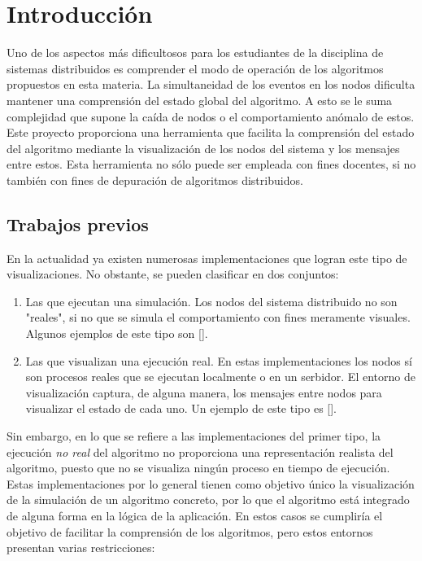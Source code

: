 \chapter{Introducción}
\label{ch:intro}

Uno de los aspectos más dificultosos para los estudiantes de la disciplina de sistemas distribuidos es comprender el modo de operación de los algoritmos propuestos en esta materia. La simultaneidad de los eventos en los nodos dificulta mantener una comprensión del estado global del algoritmo. A esto se le suma complejidad que supone la caída de nodos o el comportamiento anómalo de estos. Este proyecto proporciona una herramienta que facilita la comprensión del estado del algoritmo mediante la visualización de los nodos del sistema y los mensajes entre estos. Esta herramienta no sólo puede ser empleada con fines docentes, si no también con fines de depuración de algoritmos distribuidos.

\section{Trabajos previos}

En la actualidad ya existen numerosas implementaciones que logran este tipo de visualizaciones. No obstante, se pueden clasificar en dos conjuntos:

\begin{enumerate}
\item Las que ejecutan una simulación. Los nodos del sistema distribuido no son "reales", si no que se simula el comportamiento con fines meramente visuales. Algunos ejemplos de este tipo son [].
\item Las que visualizan una ejecución real. En estas implementaciones los nodos sí son procesos reales que se ejecutan localmente o en un serbidor. El entorno de visualización captura, de alguna manera, los mensajes entre nodos para visualizar el estado de cada uno. Un ejemplo de este tipo es [].
\end{enumerate}

Sin embargo, en lo que se refiere a las implementaciones del primer tipo, la ejecución \textit{no real} del algoritmo no proporciona una representación realista del algoritmo, puesto que no se visualiza ningún proceso en tiempo de ejecución. Estas implementaciones por lo general tienen como objetivo único la visualización de la simulación de un algoritmo concreto, por lo que el algoritmo está integrado de alguna forma en la lógica de la aplicación. En estos casos se cumpliría el objetivo de facilitar la comprensión de los algoritmos, pero estos entornos presentan varias restricciones:

